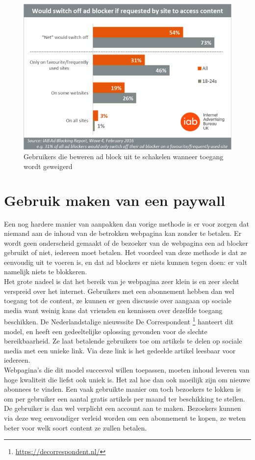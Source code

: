 \documentclass[pdftex,a4paper,12pt,twoside]{report}
\begin{document}
\begin{figure}[h!]
\centering
\includegraphics[width=12cm]{img/Adblockblock}
\caption{Gebruikers die beweren ad block uit te schakelen wanneer toegang wordt geweigerd}
\label{fig: Adblockblock}
\end{figure}

\section{Gebruik maken van een paywall}
\label{sec Gebruik maken van een paywall}
Een nog hardere manier van aanpakken dan vorige methode is er voor zorgen dat niemand aan de inhoud van de betrokken webpagina kan zonder te betalen. Er wordt geen onderscheid gemaakt of de bezoeker van de webpagina een ad blocker gebruikt of niet, iedereen moet betalen. Het voordeel van deze methode is dat ze eenvoudig uit te voeren is, en dat ad blockers er niets kunnen tegen doen: er valt namelijk niets te blokkeren.
\\
Het grote nadeel is dat het bereik van je webpagina zeer klein is en zeer slecht verspreid over het internet. Gebruikers met een abonnement hebben dan wel toegang tot de content, ze kunnen er geen discussie over aangaan op sociale media want weinig kans dat vrienden en kennissen over dezelfde toegang beschikken. De Nederlandstalige nieuwssite De Correspondent \footnote{\url{https://decorrespondent.nl/}} hanteert dit model, en heeft een gedeeltelijke oplossing gevonden voor de slechte bereikbaarheid. Ze laat betalende gebruikers toe om artikels te delen op sociale media met een unieke link. Via deze link is het gedeelde artikel leesbaar voor iedereen.
\\ 
Webpagina's die dit model succesvol willen toepassen, moeten inhoud leveren van hoge kwaliteit die liefst ook uniek is. Het zal hoe dan ook moeilijk zijn om nieuwe abonnees te vinden. Een vaak gebruikte manier om toch bezoekers te lokken is om per gebruiker een aantal gratis artikels per maand ter beschikking te stellen. De gebruiker is dan wel verplicht een account aan te maken. Bezoekers kunnen via deze weg eenvoudiger verleid worden om een abonnement te kopen, ze weten beter voor welk soort content ze zullen betalen.
\end{document}
